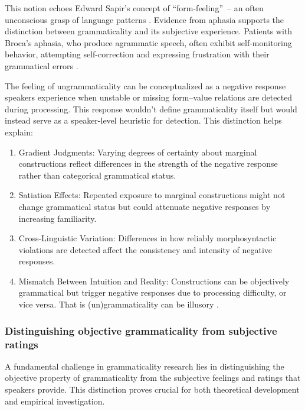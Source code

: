 \documentclass[12pt,letterpaper]{article}
\begin{document}
This notion echoes Edward Sapir's concept of \enquote{form-feeling}~--  an often unconscious grasp of language patterns \autocite{Sapir1921, Sapir1927b}. Evidence from aphasia supports the distinction between grammaticality and its subjective experience. Patients with Broca's aphasia, who produce agrammatic speech, often exhibit self-monitoring behavior, attempting self-correction and expressing frustration with their grammatical errors \autocite{oomen2005}.

The feeling of ungrammaticality can be conceptualized as a negative response speakers experience when unstable or missing form--value relations are detected during processing. This response wouldn't define grammaticality itself but would instead serve as a speaker-level heuristic for detection. This distinction helps explain:

\begin{enumerate}
    \item Gradient Judgments: Varying degrees of certainty about marginal constructions reflect differences in the strength of the negative response rather than categorical grammatical status.

    \item Satiation Effects: Repeated exposure to marginal constructions might not change grammatical status but could attenuate negative responses by increasing familiarity.

    \item Cross-Linguistic Variation: Differences in how reliably morphosyntactic violations are detected affect the consistency and intensity of negative responses.

    \item Mismatch Between Intuition and Reality: Constructions can be objectively grammatical but trigger negative responses due to processing difficulty, or vice versa. That is (un)grammaticality can be illusory \parencite{Fanselow2021}.
\end{enumerate}

\subsubsection{Distinguishing objective grammaticality from subjective ratings}\label{sec:objective-subjective}

A fundamental challenge in grammaticality research lies in distinguishing the objective property of grammaticality from the subjective feelings and ratings that speakers provide. This distinction proves crucial for both theoretical development and empirical investigation.
\end{document}
